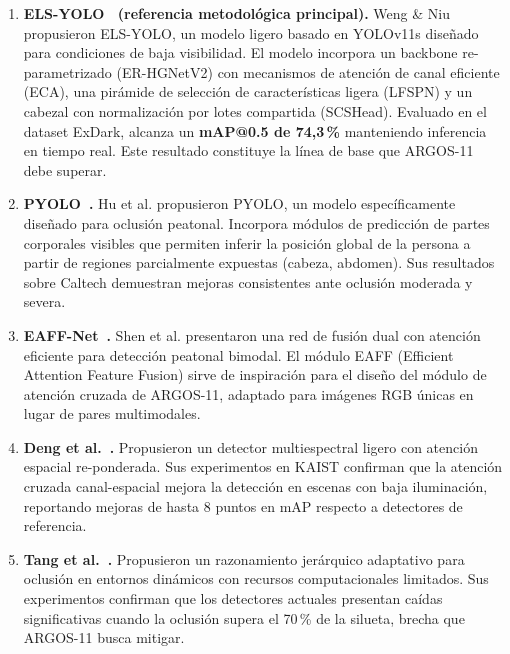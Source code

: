 \begin{enumerate}

\item \textbf{ELS-YOLO~\cite{ElsYolo2025} (referencia metodol\'ogica
principal).} Weng \& Niu propusieron ELS-YOLO, un modelo ligero
basado en YOLOv11s dise\~{n}ado para condiciones de baja
visibilidad. El modelo incorpora un backbone re-parametrizado
(ER-HGNetV2) con mecanismos de atenci\'on de canal eficiente
(ECA), una pir\'amide de selecci\'on de caracter\'{i}sticas
ligera (LFSPN) y un cabezal con normalizaci\'on por lotes
compartida (SCSHead). Evaluado en el dataset ExDark, alcanza un
\textbf{mAP@0.5 de 74{,}3\,\%} manteniendo inferencia en tiempo
real. Este resultado constituye la l\'{i}nea de base que
ARGOS-11 debe superar.

\item \textbf{PYOLO~\cite{Hu2025}.} Hu et al. propusieron PYOLO,
un modelo espec\'{i}ficamente dise\~{n}ado para oclusi\'on
peatonal. Incorpora m\'odulos de predicci\'on de partes
corporales visibles que permiten inferir la posici\'on global de
la persona a partir de regiones parcialmente expuestas (cabeza,
abdomen). Sus resultados sobre Caltech demuestran mejoras
consistentes ante oclusi\'on moderada y severa.

\item \textbf{EAFF-Net~\cite{Shen2025}.} Shen et al. presentaron
una red de fusi\'on dual con atenci\'on eficiente para detecci\'on
peatonal bimodal. El m\'odulo EAFF (Efficient Attention Feature
Fusion) sirve de inspiraci\'on para el dise\~{n}o del m\'odulo de
atenci\'on cruzada de ARGOS-11, adaptado para im\'agenes RGB
\'unicas en lugar de pares multimodales.

\item \textbf{Deng et al.~\cite{Deng2024}.} Propusieron un detector
multiespectral ligero con atenci\'on espacial re-ponderada. Sus
experimentos en KAIST confirman que la atenci\'on cruzada
canal-espacial mejora la detecci\'on en escenas con baja
iluminaci\'on, reportando mejoras de hasta 8 puntos en mAP
respecto a detectores de referencia.

\item \textbf{Tang et al.~\cite{Tang2026}.} Propusieron un
razonamiento jer\'arquico adaptativo para oclusi\'on en entornos
din\'amicos con recursos computacionales limitados. Sus
experimentos confirman que los detectores actuales presentan
ca\'{i}das significativas cuando la oclusi\'on supera el 70\,\%
de la silueta, brecha que ARGOS-11 busca mitigar.

\end{enumerate}

